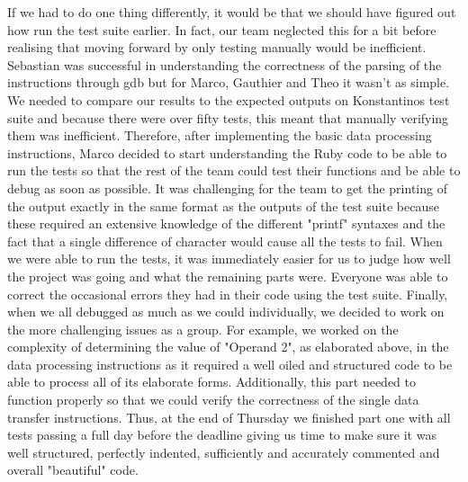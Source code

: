 \documentclass[10pt]{article}
\begin{document}
\hspace*{0.6cm} If we had to do one thing differently, it would be that we should have figured out how run the test suite earlier. In fact, our team neglected this for a bit before realising that moving forward by only testing manually would be inefficient. Sebastian was successful in understanding the correctness of the parsing of the instructions through gdb but for Marco, Gauthier and Theo it wasn't as simple. We needed to compare our results to the expected outputs on Konstantinos test suite and because there were over fifty tests, this meant that manually verifying them was inefficient. Therefore, after implementing the basic data processing instructions, Marco decided to start understanding the Ruby code to be able to run the tests so that the rest of the team could test their functions and be able to debug as soon as possible. It was challenging for the team to get the printing of the output exactly in the same format as the outputs of the test suite because these required an extensive knowledge of the different "printf" syntaxes and the fact that a single difference of character would cause all the tests to fail. When we were able to run the tests, it was immediately easier for us to judge how well the project was going and what the remaining parts were. Everyone was able to correct the occasional errors they had in their code using the test suite. \newline
\hspace*{0.6cm} Finally, when we all debugged as much as we could individually, we decided to work on the more challenging issues as a group. For example, we worked on the complexity of determining the value of "Operand 2", as elaborated above, in the data processing instructions as it required a well oiled and structured code to be able to process all of its elaborate forms. Additionally, this part needed to function properly so that we could verify the correctness of the single data transfer instructions. \newline
\hspace*{0.6cm} Thus, at the end of Thursday we finished part one with all tests passing a full day before the deadline giving us time to make sure it was well structured, perfectly indented, sufficiently and accurately commented and overall "beautiful" code.
\end{document}
